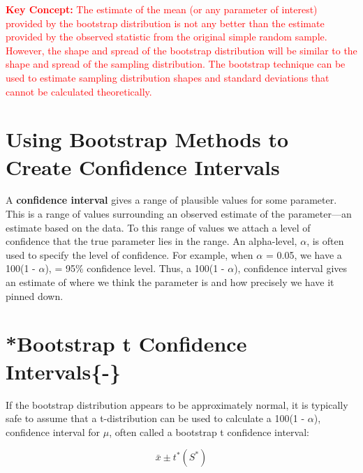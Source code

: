 \documentclass[
]{report}
\theoremstyle{definition}
\theoremstyle{definition}
\theoremstyle{definition}
\theoremstyle{definition}
\theoremstyle{remark}
\begin{document}
\Large

\textbf{\textcolor{red}{Key Concept:}}
\textcolor{red}{The estimate of the mean (or any parameter of interest) provided by the bootstrap distribution is not any better than the estimate provided by the observed statistic from the original simple random sample. However, the shape and spread of the bootstrap distribution will be similar to the shape and spread of the sampling distribution. The bootstrap technique can be used to estimate sampling distribution shapes and standard deviations that cannot be calculated theoretically.}

\normalsize

\hypertarget{using-bootstrap-methods-to-create-confidence-intervals}{%
\section{\texorpdfstring{\textbf{Using Bootstrap Methods to Create Confidence Intervals}}{Using Bootstrap Methods to Create Confidence Intervals}}\label{using-bootstrap-methods-to-create-confidence-intervals}}

A \textbf{confidence interval} gives a range of plausible values for some parameter. This is a range of values surrounding an observed estimate of the parameter---an estimate based on the data. To this range of values we attach a level of confidence that the true parameter lies in the range. An alpha-level, \(\alpha\), is often used to specify the level of confidence. For example, when \(\alpha\) = 0.05, we have a 100(1 - \(\alpha\)), = 95\(\%\) confidence level. Thus, a 100(1 - \(\alpha\)), confidence interval gives an estimate of where we think the parameter is and how precisely we have it pinned down.

\hypertarget{bootstrap-t-confidence-intervals-}{%
\section{\texorpdfstring{*\textbf{Bootstrap t Confidence Intervals}\{-\}}{*Bootstrap t Confidence Intervals\{-\}}}\label{bootstrap-t-confidence-intervals-}}

If the bootstrap distribution appears to be approximately normal, it is typically safe to assume that a
t-distribution can be used to calculate a 100(1 - \(\alpha\)), confidence interval for \(\mu\), often called a bootstrap
t confidence interval:

\begin{equation} 
  \bar{x} \pm t^*\left(S^*\right)
  \tag{1.1} \label{eq:1_1}
\end{equation}
\end{document}
